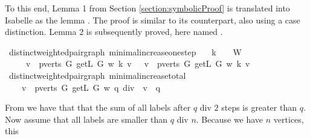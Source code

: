 \begin{isabellebody}
\begin{isamarkuptext}
To this end, Lemma 1 from Section \ref{section:symbolicProof} is translated into Isabelle as the lemma
. The proof is 
similar to its counterpart, also using a case distinction. Lemma 2 is subsequently proved, here
named .%
\end{isamarkuptext}\isamarkuptrue%
\isamarkupfalse%
{\isacharparenleft}\ distinct{\isacharunderscore}weighted{\isacharunderscore}pair{\isacharunderscore}graph{\isacharparenright}\ minimal{\isacharunderscore}increase{\isacharunderscore}one{\isacharunderscore}step{\isacharcolon}\isanewline
\ \ \ {\isachardoublequoteopen}k\ {\isacharplus}\ {}\ {\isasymin}\ W{\isachardoublequoteclose}\isanewline
\ \ \ \isanewline
\ \ \ \ {\isachardoublequoteopen}{\isacharparenleft}{\isasymSum}\ v\ {\isasymin}\ pverts\ G{\isachardot}\ getL\ G\ w\ {\isacharparenleft}k{\isacharplus}{}{\isacharparenright}\ v{\isacharparenright}\ {\isasymge}\ {\isacharparenleft}{\isasymSum}\ v\ {\isasymin}\ pverts\ G{\isachardot}\ getL\ G\ w\ k\ v{\isacharparenright}\ {\isacharplus}\ {}{\isachardoublequoteclose}\ \isanewline
%
\isadelimproof
%
\endisadelimproof
%
\isatagproof
%
\endisatagproof
{\isafoldproof}%
%
\isadelimproof
%
\endisadelimproof
%
\isadelimproof
%
\endisadelimproof
%
\isatagproof
%
\endisatagproof
{\isafoldproof}%
%
\isadelimproof
\isanewline
%
\endisadelimproof
{}\isamarkupfalse%
{\isacharparenleft}\ distinct{\isacharunderscore}weighted{\isacharunderscore}pair{\isacharunderscore}graph{\isacharparenright}\ minimal{\isacharunderscore}increase{\isacharunderscore}total{\isacharcolon}\isanewline
\ \ \ {\isachardoublequoteopen}{\isacharparenleft}{\isasymSum}\ v\ {\isasymin}\ pverts\ G{\isachardot}\ getL\ G\ w\ {\isacharparenleft}q\ div\ {}{\isacharparenright}\ v{\isacharparenright}\ {\isasymge}\ q{\isachardoublequoteclose}%
\isadelimproof
%
\endisadelimproof
%
\isatagproof
%
\endisatagproof
{\isafoldproof}%
%
\isadelimproof
%
\endisadelimproof
%
\isadelimproof
%
\endisadelimproof
%
\isatagproof
%
\endisatagproof
{\isafoldproof}%
%
\isadelimproof
%
\endisadelimproof
%
\begin{isamarkuptext}%
From  we have that that the sum of all labels after $q$ div $2$ steps is 
greater than $q$. Now assume that all labels are smaller than $q$ div $n$. Because we have $n$ vertices, this

\end{isamarkuptext}
\end{isabellebody}
